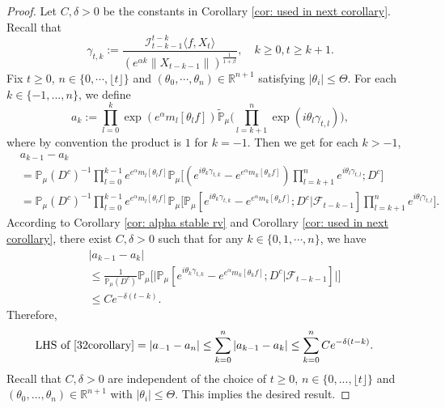 \documentclass[12pt,a4paper]{amsart}
\theoremstyle{plain}
\theoremstyle{definition}
\numberwithin{equation}{section}
\begin{document}
\begin{proof}
	Let $C,\delta > 0$ be the constants in Corollary \ref{cor: used in next corollary}.
    Recall that \[\gamma_{t,k}:=\frac {\mathcal I_{t-k-1}^{t-k}\langle f ,X_t\rangle}{(e^{\alpha k}\|X_{t-k-1}\|)^\frac{1}{1+\beta}},\quad k \geq 0, t\geq k+1. \]
    Fix $t\geq 0$, $n \in \{0, \cdots, \lfloor t \rfloor\}$ and $(\theta_0, \cdots, \theta_n)\in \mathbb R^{n+1}$ 
    satisfying $|\theta_i|\leq \Theta$.
    For each $k\in\{-1,...,n\}$, we define
    \[a_k:=\prod_{l=0}^{k}\exp(e^{\alpha}m_l[\theta_lf])\mathbb{\tilde{P}}_{\mu}\Big(\prod_{l=k+1}^{n}\exp\left(i\theta_l\gamma_{t,l}\right)\Big),\]
     where by convention the product is $1$ for $k=-1$. Then we get for each $k > -1$,
    \begin{align*}
        &a_{k-1} - a_k
        \\&=\mathbb{P}_{\mu}(D^c)^{-1}\prod_{l=0}^{k-1}e^{e^{\alpha}m_l[\theta_l f]}\mathbb{P}_{\mu}\Big[(e^{i\theta_{k}\gamma_{t,k}}-e^{e^{\alpha}m_k[\theta_k f]})\prod_{l=k+1}^ne^{i\theta_{l}\gamma_{t,l}};D^c\Big]
        \\&=\mathbb{P}_{\mu}(D^c)^{-1}\prod_{l=0}^{k-1}e^{e^{\alpha}m_l[\theta_l f]}\mathbb{P}_{\mu}\Big[\mathbb P_\mu[e^{i\theta_{k}\gamma_{t,k}}-e^{e^{\alpha}m_k[\theta_k f]}; D^c|\mathscr F_{t-k-1}]\prod_{l=k+1}^ne^{i\theta_{l}\gamma_{t,l}}\Big].
    \end{align*}
    According to Corollary \ref{cor: alpha stable rv} and Corollary \ref{cor: used in next corollary}, there exist $C,\delta>0$ such that for any 
    $k\in\{0, 1, \cdots, n\}$, we have
    \begin{align*}
        &|a_{k-1}- a_k|
        \\&\leq \frac{1}{\mathbb{P}_{\mu}(D^c)}\mathbb{P}_{\mu}\Big[\big|\mathbb P_\mu[e^{i\theta_{k}\gamma_{t,k}}-e^{e^{\alpha}m_k[\theta_k f]}; D^c\big|\mathscr{F}_{t-k-1}]\big|\Big]
        \\& \leq C e^{-\delta(t-k)}.
    \end{align*}
Therefore,
\begin{equation}\begin{split}
    \text{LHS of \eqref{32corollary}}&= \left|a_{-1}-a_n\right|
    \leq\sum_{k=0}^n\left|a_{k-1}-a_k\right|
    \leq \sum_{k=0}^n C e^{-\delta(t-k)}.
\end{split}\end{equation}
	Recall that $C, \delta>0$ are independent of the choice of $t\geq 0$, $n \in \{0,...,\lfloor t \rfloor\}$ and $(\theta_0,...,\theta_n)\in \mathbb R^{n+1}$ with $|\theta_i|\leq \Theta$.
    This implies the desired result.
\end{proof}
\end{document}
